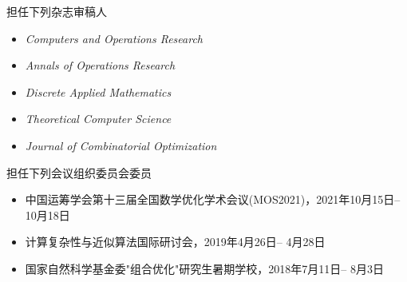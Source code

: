 %
%


{
\fontsize{9.65pt}{\baselineskip}\selectfont
担任下列杂志审稿人
\begin{itemize}[leftmargin=*]
	\item \emph{Computers and Operations Research}
	\item \emph{Annals of Operations Research}
	\item \emph{Discrete Applied Mathematics}
	\item \emph{Theoretical Computer Science}
	\item \emph{Journal of Combinatorial Optimization}
\end{itemize}

担任下列会议组织委员会委员
\begin{itemize}[leftmargin=*]
	\item 中国运筹学会第十三届全国数学优化学术会议(MOS2021)，2021年10月15日-- 10月18日
	\item 计算复杂性与近似算法国际研讨会，2019年4月26日-- 4月28日
	\item 国家自然科学基金委"组合优化"研究生暑期学校，2018年7月11日-- 8月3日
\end{itemize}


}